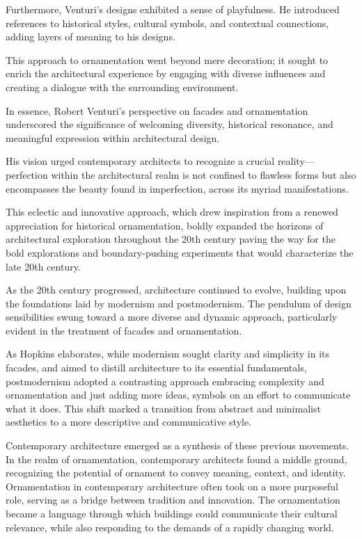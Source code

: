 Furthermore, Venturi's designs exhibited a sense of playfulness.
He introduced references to historical styles, cultural symbols, and contextual connections, adding layers of meaning to his designs.

This approach to ornamentation went beyond mere decoration;
it sought to enrich the architectural experience by engaging with diverse influences and creating a dialogue with the surrounding environment.

In essence, Robert Venturi's perspective on facades and ornamentation underscored the significance of welcoming diversity, historical resonance, and meaningful expression within architectural design.

His vision urged contemporary architects to recognize a crucial reality—perfection within the architectural realm is not confined to flawless forms but also encompasses the beauty found in imperfection, across its myriad manifestations\cite{Lutolli2020}.

This eclectic and innovative approach, which drew inspiration from a renewed appreciation for historical ornamentation, boldly expanded the horizons of architectural exploration throughout the 20th century\cite{Stamp2016} paving the way for the bold explorations and boundary-pushing experiments that would characterize the late 20th century.

As the 20th century progressed, architecture continued to evolve, building upon the foundations laid by modernism and postmodernism.
The pendulum of design sensibilities swung toward a more diverse and dynamic approach, particularly evident in the treatment of facades and ornamentation.

As Hopkins\cite{Hopkins2020} elaborates, while modernism sought clarity and simplicity in its facades, and aimed to distill architecture to its essential fundamentals, postmodernism adopted a contrasting approach embracing complexity and ornamentation and just adding more ideas, symbols on an effort to communicate what it does.
This shift marked a transition from abstract and minimalist aesthetics to a more descriptive and communicative style.

Contemporary architecture emerged as a synthesis of these previous movements.
In the realm of ornamentation, contemporary architects found a middle ground, recognizing the potential of ornament to convey meaning, context, and identity.
Ornamentation in contemporary architecture often took on a more purposeful role, serving as a bridge between tradition and innovation.
The ornamentation became a language through which buildings could communicate their cultural relevance, while also responding to the demands of a rapidly changing world.



